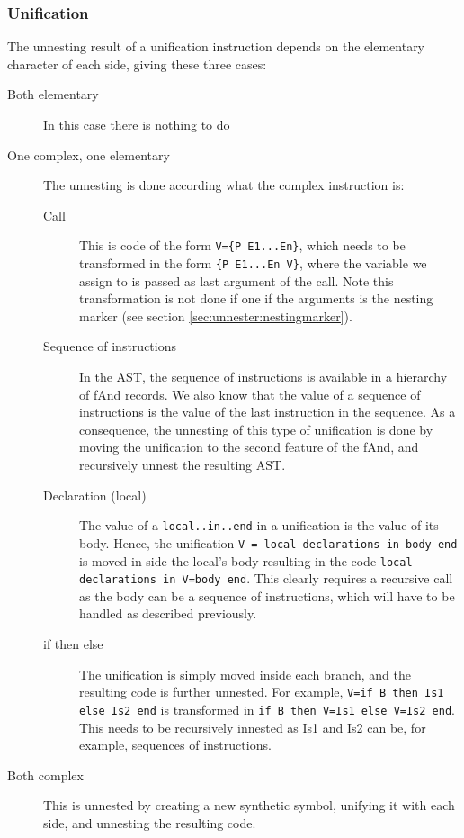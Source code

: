 \documentclass[a4paper]{memoir}
\begin{document}
\subsubsection{Unification}\label{sec:arch:unnester:unification}
The unnesting result of a unification instruction depends on the elementary character of each side, giving these three cases:
\begin{description}
  \item[Both elementary]In this case there is nothing to do
  \item[One complex, one elementary] The unnesting is done according what the complex instruction is: 
    \begin{description}
      \item[Call] This is code of the form \lstinline!V={P E1...En}!, which needs to be transformed in the form \lstinline!{P E1...En V}!, where the variable we assign to is passed as last argument of the call. Note this transformation is not done if one if the arguments is the nesting marker (see section \ref{sec:unnester:nestingmarker}).
      \item[Sequence of instructions] In the AST, the sequence of instructions is available in a hierarchy of fAnd records. We also know that the value of a sequence of instructions is the value of the last instruction in the sequence. As a consequence, the unnesting of this type of unification is done by moving the unification to the second feature of the fAnd, and recursively unnest the resulting AST.
      \item[Declaration (local)] The value of a \lstinline!local..in..end! in a unification is the value of its body. Hence, the unification \lstinline!V = local declarations in body end! is moved in side the local's body resulting in the code \lstinline!local declarations in V=body end!. This clearly requires a recursive call as the body can be a sequence of instructions, which will have to be handled as described previously.
      \item[if then else] The unification is simply moved inside each branch, and the resulting code is further unnested. For example, \lstinline!V=if B then Is1 else Is2 end! is transformed in \lstinline!if B then V=Is1 else V=Is2 end!. This needs to be recursively innested as Is1 and Is2 can be, for example,  sequences of instructions.
    \end{description}
  \item[Both complex] This is unnested by creating a new synthetic symbol, unifying it with each side, and unnesting the resulting code.

\end{description}
\end{document}
